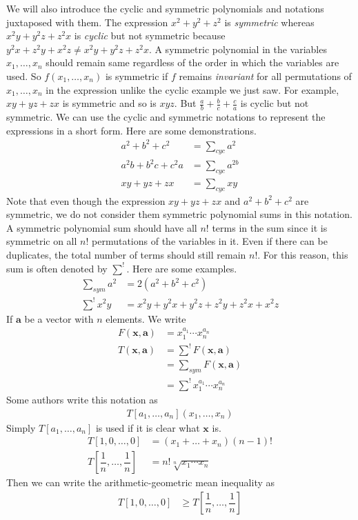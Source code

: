 \documentclass{subfile}
\begin{document}
	We will also introduce the cyclic and symmetric polynomials and notations juxtaposed with them. The expression $x^{2}+y^{2}+z^{2}$ is \textit{symmetric} whereas $x^{2}y+y^{2}z+z^{2}x$ is \textit{cyclic} but not symmetric because $y^{2}x+z^{2}y+x^{2}z\neq x^{2}y+y^{2}z+z^{2}x$. A symmetric polynomial in the variables $x_{1},\ldots,x_{n}$ should remain same regardless of the order in which the variables are used. So $f(x_{1},\ldots,x_{n})$ is symmetric if $f$ remains \textit{invariant} for all permutations of $x_{1},\ldots,x_{n}$ in the expression unlike the cyclic example we just saw. For example, $xy+yz+zx$ is symmetric and so is $xyz$. But $\frac{a}{b}+\frac{b}{c}+\frac{c}{a}$ is cyclic but not symmetric. We can use the cyclic and symmetric notations to represent the expressions in a short form. Here are some demonstrations.
		\begin{align*}
			a^{2}+b^{2}+c^{2}
				& = \sum_{cyc}a^{2}\\
			a^{2}b+b^{2}c+c^{2}a
				& = \sum_{cyc}a^{2b}\\
			xy+yz+zx
				& = \sum_{cyc}xy
		\end{align*}
	Note that even though the expression $xy+yz+zx$ and $a^{2}+b^{2}+c^{2}$ are symmetric, we do not consider them symmetric polynomial sums in this notation. A symmetric polynomial sum should have all $n!$ terms in the sum since it is symmetric on all $n!$ permutations of the variables in it. Even if there can be duplicates, the total number of terms should still remain $n!$. For this reason, this sum is often denoted by $\sum^{!}$. Here are some examples.
		\begin{align*}
			\sum_{sym}a^{2}
				& = 2(a^{2}+b^{2}+c^{2})\\
			\sum^{!} x^{2}y
				& = x^{2}y+y^{2}x+y^{2}z+z^{2}y+z^{2}x+x^{2}z
		\end{align*}
	If $\mathbf{a}$ be a vector with $n$ elements. We write
		\begin{align*}
			F(\mathbf{x}, \mathbf{a})
				& = x_{1}^{a_{1}}\cdots x_{n}^{a_{n}}\\
			T(\mathbf{x},\mathbf{a})
				& = \sum^{!}F(\mathbf{x},\mathbf{a})\\
				& = \sum_{sym} F(\mathbf{x},\mathbf{a})\\
				& = \sum^{!}x_{1}^{a_{1}}\cdots x_{n}^{a_{n}}
		\end{align*}
	Some authors write this notation as
		\begin{align*}
			T[a_{1},\ldots,a_{n}](x_{1},\ldots,x_{n})
		\end{align*}
	Simply $T[a_{1},\ldots,a_{n}]$ is used if it is clear what $\mathbf{x}$ is.
		\begin{align*}
			T[1,0,\ldots,0]
				& = (x_{1}+\ldots+x_{n})(n-1)!\\
			T\left[\dfrac{1}{n},\ldots,\dfrac{1}{n}\right]
				& = n!\sqrt[n]{x_{1}\cdots x_{n}}
		\end{align*}
	Then we can write the arithmetic-geometric mean inequality as
		\begin{align*}
			T[1,0,\ldots,0]
				& \geq T\left[\dfrac{1}{n},\ldots,\dfrac{1}{n}\right]
		\end{align*}
\end{document}
